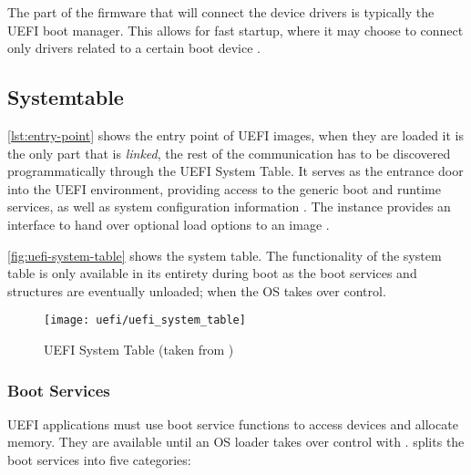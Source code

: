 The part of the firmware that will connect the device drivers is typically the \ac{UEFI} boot manager.
This allows for fast startup, where it may choose to connect only drivers related to a certain boot device \cite[Section 2.5.6]{uefi-spec}.

\subsection{Systemtable}



\autoref{lst:entry-point} shows the entry point of \ac{UEFI} images, when they are loaded it is the only part that is \emph{linked}, the rest of the communication has to be discovered programmatically through the \ac{UEFI} System Table.
It serves as the entrance door into the \ac{UEFI} environment, providing access to the generic boot and runtime services, as well as system configuration information \cite[Section 3.3]{tianocore-edk2-driver-writer-s-guide}.
The  instance provides an interface to hand over optional load options to an image \cite{beyond-bios}.

\autoref{fig:uefi-system-table} shows the system table.
The functionality of the system table is only available in its entirety during boot as the boot services and structures are eventually unloaded; when the \ac{OS} takes over control.

\begin{figure}[htb]%
    \centering%
    \texttt{[image: uefi/uefi\_system\_table]}%
    \caption[\acs{UEFI} System Table]{\acs{UEFI} System Table (taken from \cite[Vol 2, Figure 2-5]{pi-spec})}%
    \label{fig:uefi-system-table}%
\end{figure}

\subsubsection{Boot Services}

\ac{UEFI} applications must use boot service functions to access devices and allocate memory.
They are available until an \ac{OS} loader takes over control with .
\cite[Section 7]{uefi-spec} splits the boot services into five categories:

